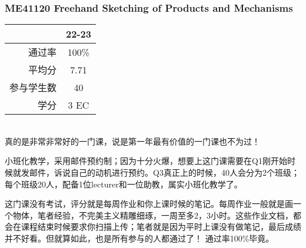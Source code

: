 \subsubsection{ME41120 Freehand Sketching of Products and Mechanisms}
\begin{minipage}{0.45\textwidth}
\centering
{}
\end{minipage}%
\begin{minipage}{0.45\textwidth}
\raggedleft
\begin{tabular}{r|c}
\textbf{ } & \textbf{22-23} \\ \hline
通过率 & 100\% \\ 
平均分 & 7.71 \\ 
参与学生数 & 40 \\
学分 & 3 EC\\
\end{tabular}
\end{minipage}\\

真的是非常非常好的一门课，说是第一年最有价值的一门课也不为过！

小班化教学，采用邮件预约制；因为十分火爆，想要上这门课需要在Q1刚开始时候就发邮件，诉说自己的动机进行预约。Q3真正上的时候，40人会分为2个班级；每个班级20人，配备1位lecturer和一位助教，属实小班化教学了。

这门课没有考试，评分就是每周作业和你上课时候的笔记。每周作业一般就是画一个物体，笔者经验，不完美主义精雕细琢，一周至多2，3小时。这些作业文档，都会在课程结束时候要求你扫描上传；笔者就是因为平时上课没有做笔记，最后成绩并不好看。但就算如此，也是所有参与的人都通过了！ 通过率100\%毕竟。

